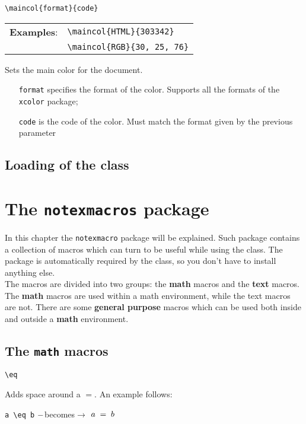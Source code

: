 \documentclass[]{notex}
\newcommand{\becomes}[1]{\hspace{#1} $\--$becomes$\rightarrow$ \hspace{#1}}
\begin{document}
\begin{tcolorbox}
    \verb|\maincol{format}{code}|
    \tcblower
    \begin{tabular}{r l}
        \textbf{Examples}: & \verb|\maincol{HTML}{303342}| \\ 
                           & \verb|\maincol{RGB}{30, 25, 76}|
    \end{tabular}
\end{tcolorbox}

\noindent Sets the main color for the document.
\begin{itemize}
    \item [\texttt{format}] specifies the format of the color. Supports all the formats of the \texttt{xcolor} package;
    \item [\texttt{code}] is the code of the color. Must match the format given by the previous parameter
\end{itemize}

\section{Loading of the class}

\chapter{The \texttt{notexmacros} package}

\noindent In this chapter the \texttt{notexmacro} package will be explained. Such package contains a collection of macros which can turn to be useful while using the class. The package is automatically required by the class, so you don't have to install anything else.
\\
\indent The macros are divided into two groups: the \textbf{math} macros and the \textbf{text} macros. The \textbf{math} macros are used within a math environment, while the text macros are not. There are some \textbf{general purpose} macros which can be used both inside and outside a \textbf{math} environment.

\section{The \texttt{math} macros}

\begin{tcolorbox}
    \verb|\eq|
\end{tcolorbox}

\noindent Adds space around a $=$. An example follows:
\begin{center}
    \verb|a \eq b| \becomes{20pt} $a \; = \; b$
\end{center}
\end{document}
